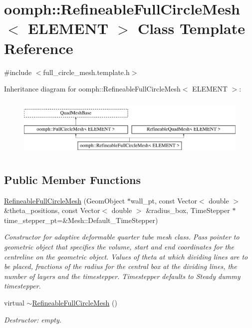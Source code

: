\hypertarget{classoomph_1_1RefineableFullCircleMesh}{}\section{oomph\+:\+:Refineable\+Full\+Circle\+Mesh$<$ E\+L\+E\+M\+E\+NT $>$ Class Template Reference}
\label{classoomph_1_1RefineableFullCircleMesh}


{\ttfamily \#include $<$full\+\_\+circle\+\_\+mesh.\+template.\+h$>$}

Inheritance diagram for oomph\+:\+:Refineable\+Full\+Circle\+Mesh$<$ E\+L\+E\+M\+E\+NT $>$\+:\begin{figure}[H]
\begin{center}
\leavevmode
\includegraphics[height=2.886598cm]{classoomph_1_1RefineableFullCircleMesh}
\end{center}
\end{figure}
\subsection*{Public Member Functions}
\begin{DoxyCompactItemize}
\item 
\hyperlink{classoomph_1_1RefineableFullCircleMesh_a08abf23ee7b1c7cc3082bcf8aa9fc8c9}{Refineable\+Full\+Circle\+Mesh} (Geom\+Object $\ast$wall\+\_\+pt, const Vector$<$ double $>$ \&theta\+\_\+positions, const Vector$<$ double $>$ \&radius\+\_\+box, Time\+Stepper $\ast$time\+\_\+stepper\+\_\+pt=\&Mesh\+::\+Default\+\_\+\+Time\+Stepper)
\begin{DoxyCompactList}\small\item\em Constructor for adaptive deformable quarter tube mesh class. Pass pointer to geometric object that specifies the volume, start and end coordinates for the centreline on the geometric object. Values of theta at which dividing lines are to be placed, fractions of the radius for the central box at the dividing lines, the number of layers and the timestepper. Timestepper defaults to Steady dummy timestepper. \end{DoxyCompactList}\item 
virtual \hyperlink{classoomph_1_1RefineableFullCircleMesh_ac50b75d390504a37ecc8a86daebc78ee}{$\sim$\+Refineable\+Full\+Circle\+Mesh} ()
\begin{DoxyCompactList}\small\item\em Destructor\+: empty. \end{DoxyCompactList}\end{DoxyCompactItemize}
